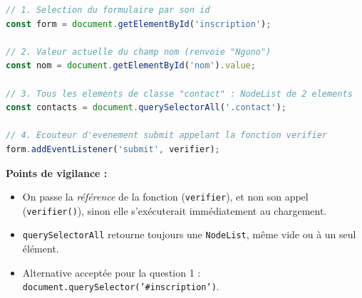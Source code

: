 \documentclass[11pt]{article}
\begin{document}
\begin{corrige}
\begin{lstlisting}[language=JavaScript]
// 1. Selection du formulaire par son id
const form = document.getElementById('inscription');

// 2. Valeur actuelle du champ nom (renvoie "Ngono")
const nom = document.getElementById('nom').value;

// 3. Tous les elements de classe "contact" : NodeList de 2 elements
const contacts = document.querySelectorAll('.contact');

// 4. Ecouteur d'evenement submit appelant la fonction verifier
form.addEventListener('submit', verifier);
\end{lstlisting}
\textbf{Points de vigilance :}
\begin{itemize}
    \item On passe la \emph{référence} de la fonction (\texttt{verifier}), et non son appel (\texttt{verifier()}), sinon elle s'exécuterait immédiatement au chargement.
    \item \texttt{querySelectorAll} retourne toujours une \texttt{NodeList}, même vide ou à un seul élément.
    \item Alternative acceptée pour la question 1 : \texttt{document.querySelector('\#inscription')}.
\end{itemize}
\end{corrige}
\end{document}
